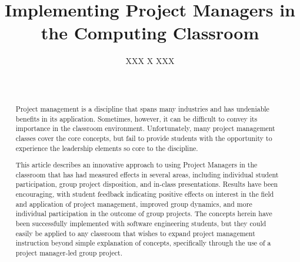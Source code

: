 \documentclass{sig-alternate}
\newif\ifisnopii
\begin{document}
%



\title{Implementing Project Managers in the Computing Classroom}

\ifisnopii %
\author{
\alignauthor
Samuel A Malachowsky\\
       \affaddr{Rochester Institute of Technology}\\
       \affaddr{Rochester, NY, USA}\\
       \email{samvse@rit.edu}
}
\else %
\author{
\alignauthor
XXX X XXX\\
       \\
       \\
}
\fi %

\maketitle
\begin{abstract}
Project management is a discipline that spans many industries and has undeniable benefits in its application. Sometimes, however, it can be difficult to convey its importance in the classroom environment. Unfortunately, many project management classes cover the core concepts, but fail to provide students with the opportunity to experience the leadership elements so core to the discipline.

This article describes an innovative approach to using Project Managers in the classroom that has had
measured effects in several areas, including individual student participation, group project disposition, and
in-class presentations. Results have been encouraging, with student feedback indicating positive effects
on interest in the field and application of project management, improved group dynamics, and more
individual participation in the outcome of group projects. The concepts herein have been successfully
implemented with software engineering students, but they could easily be applied to any classroom that
wishes to expand project management instruction beyond simple explanation of concepts, specifically
through the use of a project manager-led group project.
\end{abstract}
\end{document}
